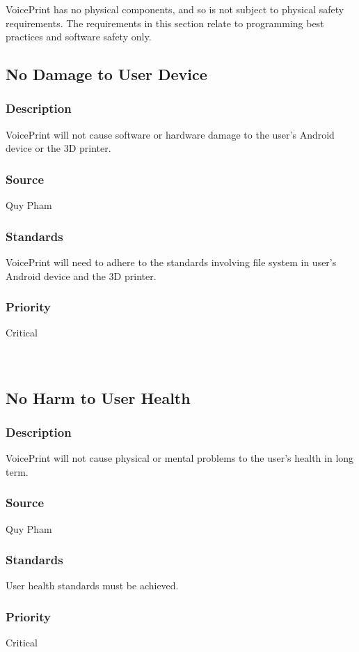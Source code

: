 VoicePrint has no physical components, and so is not subject to physical safety requirements. The requirements in this section relate to programming best practices and software safety only.

\subsection{No Damage to User Device}
\subsubsection{Description}
VoicePrint will not cause software or hardware damage to the user's Android device or the 3D printer.
\subsubsection{Source}
Quy Pham
\subsubsection{Standards}
VoicePrint will need to adhere to the standards involving file system in user's Android device and the 3D printer.
\subsubsection{Priority}
Critical\\
\\
\\

\subsection{No Harm to User Health}
\subsubsection{Description}
VoicePrint will not cause physical or mental problems to the user's health in long term.
\subsubsection{Source}
Quy Pham
\subsubsection{Standards}
User health standards must be achieved.
\subsubsection{Priority}
Critical\\
\\
\\

